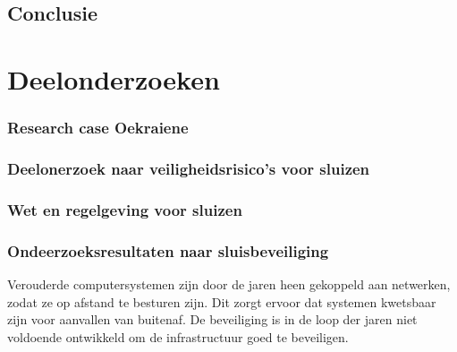 \subsection{Conclusie}

 
\newpage
\section{Deelonderzoeken}



\subsubsection{Research case Oekraiene}
\subsubsection{Deelonerzoek naar veiligheidsrisico's voor sluizen}
\subsubsection{Wet en regelgeving voor sluizen}


\subsubsection{Ondeerzoeksresultaten naar sluisbeveiliging}



Verouderde computersystemen zijn door de jaren heen gekoppeld aan netwerken, zodat ze op afstand te besturen zijn. Dit zorgt ervoor dat systemen kwetsbaar zijn voor aanvallen van buitenaf. De beveiliging is in de loop der jaren niet voldoende ontwikkeld om de infrastructuur goed te beveiligen.

